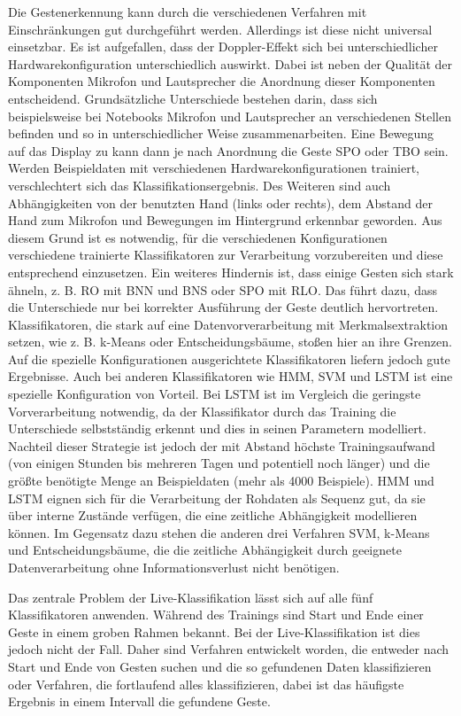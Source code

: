 Die Gestenerkennung kann durch die verschiedenen Verfahren mit Einschränkungen
gut durchgeführt werden. Allerdings ist diese nicht universal einsetzbar. Es ist
aufgefallen, dass der Doppler-Effekt sich bei unterschiedlicher
Hardwarekonfiguration unterschiedlich auswirkt. Dabei ist neben der Qualität der
Komponenten Mikrofon und Lautsprecher die Anordnung dieser Komponenten
entscheidend. Grundsätzliche Unterschiede bestehen darin, dass sich
beispielsweise bei Notebooks Mikrofon und Lautsprecher an verschiedenen Stellen
befinden und so in unterschiedlicher Weise zusammenarbeiten. Eine Bewegung auf
das Display zu kann dann je nach Anordnung die Geste \acl{SPO} oder \acl{TBO}
sein. Werden Beispieldaten mit verschiedenen Hardwarekonfigurationen trainiert,
verschlechtert sich das Klassifikationsergebnis. Des Weiteren sind auch
Abhängigkeiten von der benutzten Hand (links oder rechts), dem Abstand der Hand
zum Mikrofon und Bewegungen im Hintergrund erkennbar geworden. Aus diesem Grund
ist es notwendig, für die verschiedenen Konfigurationen verschiedene trainierte
Klassifikatoren zur Verarbeitung vorzubereiten und diese entsprechend
einzusetzen. Ein weiteres Hindernis ist, dass einige Gesten sich stark ähneln,
z. B. \ac{RO} mit \ac{BNN} und \ac{BNS} oder \ac{SPO} mit \ac{RLO}. Das führt
dazu, dass die Unterschiede nur bei korrekter Ausführung der Geste deutlich
hervortreten.
Klassifikatoren, die stark auf eine Datenvorverarbeitung mit Merkmalsextraktion
setzen, wie z. B. k-Means oder Entscheidungsbäume, stoßen hier an ihre Grenzen.
Auf die spezielle Konfigurationen ausgerichtete Klassifikatoren liefern jedoch
gute Ergebnisse. Auch bei anderen Klassifikatoren wie \ac{HMM}, \ac{SVM} und
\ac{LSTM} ist eine spezielle Konfiguration von Vorteil. Bei \ac{LSTM} ist im
Vergleich die geringste Vorverarbeitung notwendig, da der Klassifikator durch das
Training die Unterschiede selbstständig erkennt und dies in seinen Parametern
modelliert. Nachteil dieser Strategie ist jedoch der mit Abstand höchste
Trainingsaufwand (von einigen Stunden bis mehreren Tagen und potentiell noch
länger) und die größte benötigte Menge an Beispieldaten (mehr als 4000
Beispiele). \ac{HMM} und \ac{LSTM} eignen sich für die Verarbeitung der Rohdaten
als Sequenz gut, da sie über interne Zustände verfügen, die eine zeitliche
Abhängigkeit modellieren können. Im Gegensatz dazu stehen die anderen drei
Verfahren \ac{SVM}, k-Means und Entscheidungsbäume, die die zeitliche
Abhängigkeit durch geeignete Datenverarbeitung ohne Informationsverlust nicht
benötigen.

Das zentrale Problem der Live-Klassifikation lässt sich auf alle fünf
Klassifikatoren anwenden. Während des Trainings sind Start und Ende einer Geste
in einem groben Rahmen bekannt. Bei der Live-Klassifikation ist dies jedoch
nicht der Fall. Daher sind Verfahren entwickelt worden, die entweder nach Start
und Ende von Gesten suchen und die so gefundenen Daten klassifizieren oder
Verfahren, die fortlaufend alles klassifizieren,
dabei ist das häufigste Ergebnis in einem Intervall die gefundene Geste.

